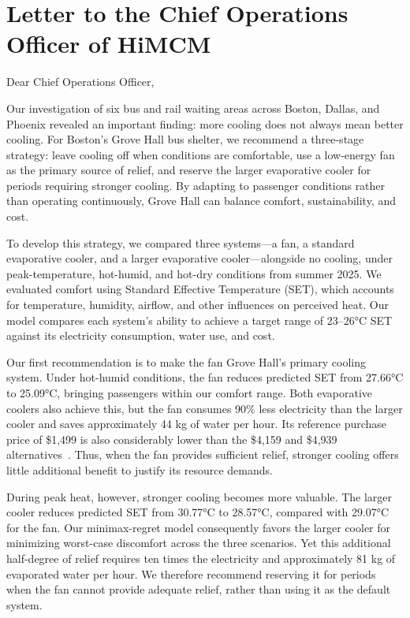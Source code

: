 \section{Letter to the Chief Operations Officer of HiMCM}

Dear Chief Operations Officer,

\indent Our investigation of six bus and rail waiting areas across Boston, Dallas, and Phoenix revealed an important finding: more cooling does not always mean better cooling. For Boston's Grove Hall bus shelter, we recommend a three-stage strategy: leave cooling off when conditions are comfortable, use a low-energy fan as the primary source of relief, and reserve the larger evaporative cooler for periods requiring stronger cooling. By adapting to passenger conditions rather than operating continuously, Grove Hall can balance comfort, sustainability, and cost.

\indent To develop this strategy, we compared three systems—a fan, a standard evaporative cooler, and a larger evaporative cooler—alongside no cooling, under peak-temperature, hot-humid, and hot-dry conditions from summer 2025. We evaluated comfort using Standard Effective Temperature (SET), which accounts for temperature, humidity, airflow, and other influences on perceived heat. Our model compares each system's ability to achieve a target range of 23–26°C SET against its electricity consumption, water use, and cost.

\indent Our first recommendation is to make the fan Grove Hall's primary cooling system. Under hot-humid conditions, the fan reduces predicted SET from 27.66°C to 25.09°C, bringing passengers within our comfort range. Both evaporative coolers also achieve this, but the fan consumes 90\% less electricity than the larger cooler and saves approximately 44 kg of water per hour. Its reference purchase price of \$1,499 is also considerably lower than the \$4,159 and \$4,939 alternatives~\cite{aireye_20_price,portacool_2000,portacool_4000}. Thus, when the fan provides sufficient relief, stronger cooling offers little additional benefit to justify its resource demands.

\indent During peak heat, however, stronger cooling becomes more valuable. The larger cooler reduces predicted SET from 30.77°C to 28.57°C, compared with 29.07°C for the fan. Our minimax-regret model consequently favors the larger cooler for minimizing worst-case discomfort across the three scenarios. Yet this additional half-degree of relief requires ten times the electricity and approximately 81 kg of evaporated water per hour. We therefore recommend reserving it for periods when the fan cannot provide adequate relief, rather than using it as the default system.

